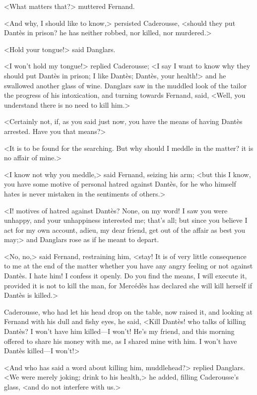 <What matters that?> muttered Fernand. 

 <And why, I should like to know,> persisted Caderousse, <should they put Dantès in prison? he has neither robbed, nor killed, nor murdered.> 

 <Hold your tongue!> said Danglars. 

 <I won't hold my tongue!> replied Caderousse; <I say I want to know why they should put Dantès in prison; I like Dantès; Dantès, your health!> and he swallowed another glass of wine.  Danglars saw in the muddled look of the tailor the progress of his intoxication, and turning towards Fernand, said, <Well, you understand there is no need to kill him.> 

 <Certainly not, if, as you said just now, you have the means of having Dantès arrested. Have you that means?> 

 <It is to be found for the searching. But why should I meddle in the matter? it is no affair of mine.> 

 <I know not why you meddle,> said Fernand, seizing his arm; <but this I know, you have some motive of personal hatred against Dantès, for he who himself hates is never mistaken in the sentiments of others.> 

 <I! motives of hatred against Dantès? None, on my word! I saw you were unhappy, and your unhappiness interested me; that's all; but since you believe I act for my own account, adieu, my dear friend, get out of the affair as best you may;> and Danglars rose as if he meant to depart. 

 <No, no,> said Fernand, restraining him, <stay! It is of very little consequence to me at the end of the matter whether you have any angry feeling or not against Dantès. I hate him! I confess it openly. Do you find the means, I will execute it, provided it is not to kill the man, for Mercédès has declared she will kill herself if Dantès is killed.> 

 Caderousse, who had let his head drop on the table, now raised it, and looking at Fernand with his dull and fishy eyes, he said, <Kill Dantès! who talks of killing Dantès? I won't have him killed—I won't! He's my friend, and this morning offered to share his money with me, as I shared mine with him. I won't have Dantès killed—I won't!> 

 <And who has said a word about killing him, muddlehead?> replied Danglars. <We were merely joking; drink to his health,> he added, filling Caderousse's glass, <and do not interfere with us.> 

